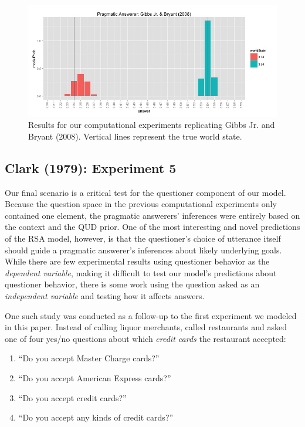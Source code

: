 \documentclass[12pt, floatsintext, jou]{apa6}
\begin{document}
 \begin{figure}
\begin{center}
\includegraphics[scale = .5]{timeExpResults.jpeg}
\end{center}
\vspace{-.25cm}
\caption{Results for our computational experiments replicating Gibbs Jr. and Bryant (2008). Vertical lines represent the true world state.}
\label{fig:timeExperimentResults}
\end{figure}


\subsection{Clark (1979): Experiment 5}
Our final scenario is a critical test for the questioner component of our model. Because the question space in the previous computational experiments only contained one element, the pragmatic answerers' inferences were entirely based on the context and the QUD prior. One of the most interesting and novel predictions of the RSA model, however, is that the questioner's choice of utterance itself should guide a pragmatic answerer's inferences about likely underlying goals. While there are few experimental results using questioner behavior as the \emph{dependent variable}, making it difficult to test our model's predictions about questioner behavior, there is some work using the question asked as an \emph{independent variable} and testing how it affects answers.

One such study was conducted as a follow-up to the first experiment we modeled in this paper. Instead of calling liquor merchants,  called restaurants and asked one of four yes/no questions about which \emph{credit cards} the restaurant accepted:

\begin{enumerate}
\item ``Do you accept Master Charge cards?'' 
\item ``Do you accept American Express cards?''
\item ``Do you accept credit cards?'' 
\item ``Do you accept any kinds of credit cards?'' 
\end{enumerate}
\end{document}
